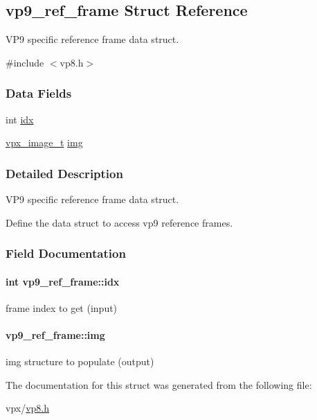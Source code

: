 \hypertarget{structvp9__ref__frame}{\subsection{vp9\+\_\+ref\+\_\+frame Struct Reference}
\label{structvp9__ref__frame}
}


V\+P9 specific reference frame data struct.  




{\ttfamily \#include $<$vp8.\+h$>$}

\subsubsection*{Data Fields}
\begin{DoxyCompactItemize}
\item 
int \hyperlink{structvp9__ref__frame_a26e0d119a61c29b72c6ccb91748b6b82}{idx}
\item 
\hyperlink{vpx__image_8h_abf5ac962cc6d71b4f0e39b1b0d033e55}{vpx\+\_\+image\+\_\+t} \hyperlink{structvp9__ref__frame_ab8d92d960007586ea7c8cd9306e98db2}{img}
\end{DoxyCompactItemize}


\subsubsection{Detailed Description}
V\+P9 specific reference frame data struct. 

Define the data struct to access vp9 reference frames. 

\subsubsection{Field Documentation}
\hypertarget{structvp9__ref__frame_a26e0d119a61c29b72c6ccb91748b6b82}{
\paragraph[{idx}]{\setlength{\rightskip}{0pt plus 5cm}int vp9\+\_\+ref\+\_\+frame\+::idx}}\label{structvp9__ref__frame_a26e0d119a61c29b72c6ccb91748b6b82}
frame index to get (input) \hypertarget{structvp9__ref__frame_ab8d92d960007586ea7c8cd9306e98db2}{
\paragraph[{img}]{ vp9\+\_\+ref\+\_\+frame\+::img}}\label{structvp9__ref__frame_ab8d92d960007586ea7c8cd9306e98db2}
img structure to populate (output) 

The documentation for this struct was generated from the following file\+:\begin{DoxyCompactItemize}
\item 
vpx/\hyperlink{vp8_8h}{vp8.\+h}\end{DoxyCompactItemize}
